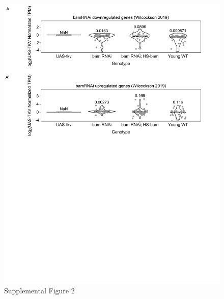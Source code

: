 \documentclass[
]{article}
\begin{document}
\begin{figure}
\centering
\includegraphics{Supplemental_Figure2.pdf}
\caption{Supplemental Figure 2}
\end{figure}
\end{document}
